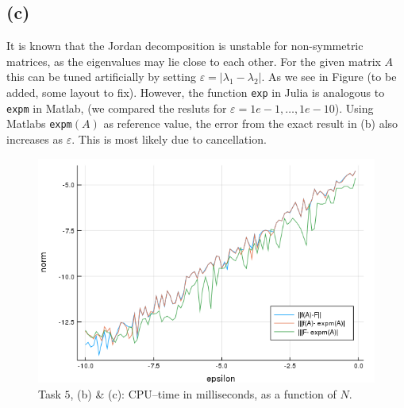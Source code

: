 \subsection*{(c)}
It is known that the Jordan decomposition is unstable for non-symmetric matrices, as the eigenvalues may lie close to each other. For the given matrix $A$ this can be tuned artificially by setting $\varepsilon=|\lambda_{1}-\lambda_{2}|$. As we see in Figure (to be added, some layout to fix). However, the function \texttt{exp} in Julia is analogous to \texttt{expm} in Matlab, (we compared the resluts for $\varepsilon = 1e-1,\ldots,1e-10$). Using Matlabs \texttt{expm}$(A)$ as reference value, the error from the exact result in (b) also increases as $\varepsilon$. This is most likely due to cancellation.

\begin{figure}
\centering
\includegraphics[scale=0.6]{Task6}
\caption{Task $5$, (b) \& (c):  CPU--time in milliseconds, as a function of $N$.}
\label{fig:task6}
\end{figure}
